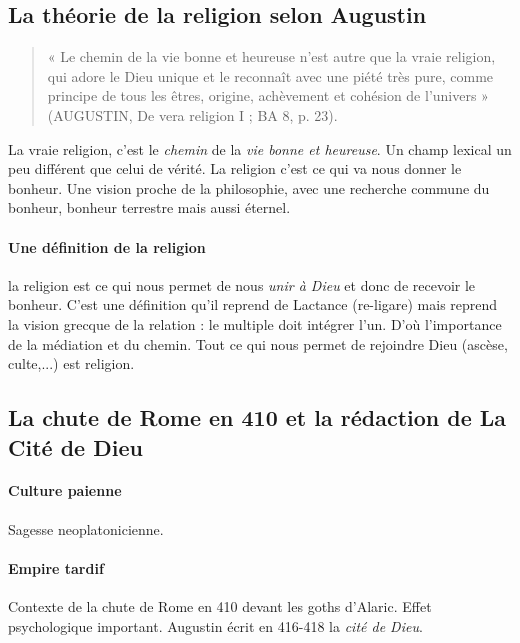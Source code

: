 \subsection{La théorie de la religion selon Augustin}




\begin{quote}
    « Le chemin de la vie bonne et heureuse n’est autre que la vraie religion, qui adore le Dieu unique et le reconnaît avec une piété très pure, comme principe de tous les êtres, origine, achèvement et cohésion de l’univers » (AUGUSTIN, De vera religion I ; BA 8, p. 23). 
\end{quote}

La vraie religion, c'est le \textit{chemin} de la \textit{vie bonne et heureuse}. Un champ lexical un peu différent que celui de vérité. La religion c'est ce qui va nous donner le bonheur. 
    Une vision proche de la philosophie, avec une recherche commune du bonheur, bonheur terrestre mais aussi éternel.
    
    \paragraph{Une définition de la religion}
    la religion est ce qui nous permet de nous \textit{unir à Dieu} et donc de recevoir le bonheur. C'est une définition qu'il reprend de Lactance (re-ligare) mais reprend la vision grecque de la relation : le multiple doit intégrer l'un.  D'où l'importance de la médiation et du chemin. Tout ce qui nous permet de rejoindre Dieu (ascèse, culte,...) est religion. 
    
    
 





\subsection{La chute de Rome en 410 et la rédaction de La Cité de Dieu}
\paragraph{Culture paienne}
Sagesse neoplatonicienne. 

\paragraph{Empire tardif} Contexte de la chute de Rome en 410 devant les goths d'Alaric. Effet psychologique important. Augustin écrit en 416-418 la \textit{cité de Dieu}.

